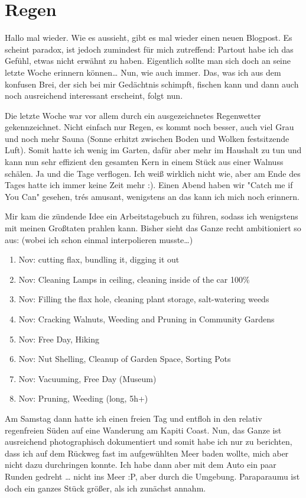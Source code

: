 \chapter{Regen}

Hallo mal wieder. Wie es aussieht, gibt es mal wieder einen neuen
Blogpost. Es scheint paradox, ist jedoch zumindest für mich zutreffend:
Partout habe ich das Gefühl, etwas nicht erwähnt zu haben. Eigentlich
sollte man sich doch an seine letzte Woche erinnern können\ldots{} Nun,
wie auch immer. Das, was ich aus dem konfusen Brei, der sich bei mir
Gedächtnis schimpft, fischen kann und dann auch noch ausreichend
interessant erscheint, folgt nun.

Die letzte Woche war vor allem durch ein ausgezeichnetes Regenwetter
gekennzeichnet. Nicht einfach nur Regen, es kommt noch besser, auch viel
Grau und noch mehr Sauna (Sonne erhitzt zwischen Boden und Wolken
festsitzende Luft). Somit hatte ich wenig im Garten, dafür aber mehr im
Haushalt zu tun und kann nun sehr effizient den gesamten Kern in einem
Stück aus einer Walnuss schälen. Ja und die Tage verflogen. Ich weiß
wirklich nicht wie, aber am Ende des Tages hatte ich immer keine Zeit
mehr :). Einen Abend haben wir "Catch me if You Can" gesehen, trés
amusant, wenigstens an das kann ich mich noch erinnern.

Mir kam die zündende Idee ein Arbeitstagebuch zu führen, sodass ich
wenigstens mit meinen Großtaten prahlen kann. Bisher sieht das Ganze
recht ambitioniert so aus: (wobei ich schon einmal interpolieren
musste\ldots)

\begin{enumerate}
\tightlist
\item
  Nov: cutting flax, bundling it, digging it out
\item
  Nov: Cleaning Lamps in ceiling, cleaning inside of the car 100\%
\item
  Nov: Filling the flax hole, cleaning plant storage, salt-watering
  weeds
\item
  Nov: Cracking Walnuts, Weeding and Pruning in Community Gardens
\item
  Nov: Free Day, Hiking
\item
  Nov: Nut Shelling, Cleanup of Garden Space, Sorting Pots
\item
  Nov: Vacuuming, Free Day (Museum)
\item
  Nov: Pruning, Weeding (long, 5h+)
\end{enumerate}

Am Samstag dann hatte ich einen freien Tag und entfloh in den relativ
regenfreien Süden auf eine Wanderung am Kapiti Coast. Nun, das Ganze ist
ausreichend photographisch dokumentiert und somit habe ich nur zu
berichten, dass ich auf dem Rückweg fast im aufgewühlten Meer baden
wollte, mich aber nicht dazu durchringen konnte. Ich habe dann aber mit
dem Auto ein paar Runden gedreht \ldots{} nicht ins Meer :P, aber durch
die Umgebung. Paraparaumu ist doch ein ganzes Stück größer, als ich
zunächst annahm.

